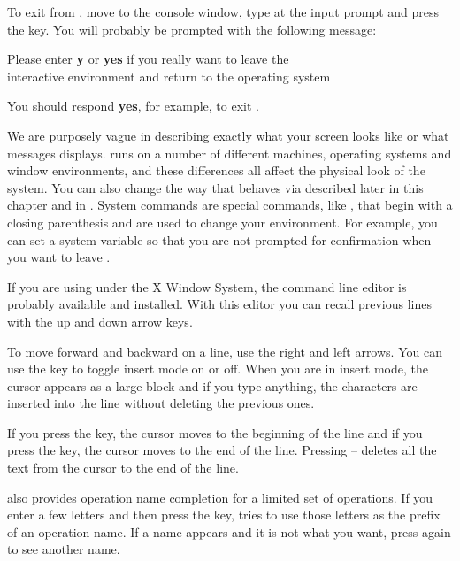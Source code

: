 \beginImportant
To exit from \Language{},  move to the console window,
type 
at the input prompt and press the  key.
You will probably be prompted with the following message:
\begin{center}
Please enter {\bf y} or {\bf yes} if you really want to leave the \\
interactive environment and return to the operating system
\end{center}
You should respond {\bf yes}, for example, to exit \Language{}.
\endImportant

We are purposely vague in describing exactly what your screen
looks like or what messages \Language{} displays.
\Language{} runs on a number of different machines, operating
systems and window environments, and these differences all affect
the physical look of the system.
You can also change the way that \Language{} behaves via
 described later in this chapter and in
.
System commands are special commands, like , that begin
with a closing parenthesis and are used to change your
environment.
For example, you can set a system variable so that you are not
prompted for confirmation when you want to leave \Language{}.

%
If you are using \Language{} under the X Window System, the
\Clef{} command line editor is probably available and installed.
With this editor you can recall previous lines with the up and
down arrow keys.

To move forward and backward on a line, use the right and
left arrows.
You can use the
key to toggle insert mode on or off.
When you are in insert mode,
the cursor appears as a large block and if you type
anything, the characters are inserted into the line without
deleting the previous ones.

If you press the
key, the cursor moves to the beginning of the line and if you press the
key, the cursor moves to the end of the line.
Pressing
--
deletes all the text from the cursor to the end of the line.

\Clef{} also provides \Language{} operation name completion for
a limited set of operations.
If you enter a few letters and then press the
 key,
\Clef{} tries to use those letters as the prefix of an \Language{}
operation name.
If a name appears and it is not what you want, press
 again
to see another name.

